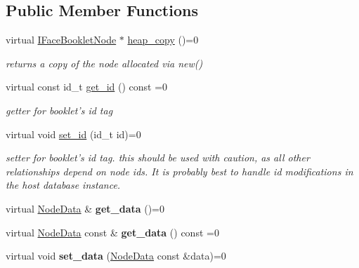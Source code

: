 \subsection*{Public Member Functions}
\begin{DoxyCompactItemize}
\item 
\hypertarget{structfb_1_1_i_face_booklet_node_a9bc90104d8cb2953baee204811aab1cf}{virtual \hyperlink{structfb_1_1_i_face_booklet_node}{I\+Face\+Booklet\+Node} $\ast$ \hyperlink{structfb_1_1_i_face_booklet_node_a9bc90104d8cb2953baee204811aab1cf}{heap\+\_\+copy} ()=0}\label{structfb_1_1_i_face_booklet_node_a9bc90104d8cb2953baee204811aab1cf}

\begin{DoxyCompactList}\small\item\em returns a copy of the node allocated via new() \end{DoxyCompactList}\item 
virtual const id\+\_\+t \hyperlink{structfb_1_1_i_face_booklet_node_a651a6fb7445f8d2c046066c1d381f424}{get\+\_\+id} () const =0
\begin{DoxyCompactList}\small\item\em getter for booklet's id tag \end{DoxyCompactList}\item 
virtual void \hyperlink{structfb_1_1_i_face_booklet_node_a944a07a514d6c88414c533dc7be3193d}{set\+\_\+id} (id\+\_\+t id)=0
\begin{DoxyCompactList}\small\item\em setter for booklet's id tag.  this should be used with caution, as all other relationships depend on node ids. It is probably best to handle id modifications in the host database instance. \end{DoxyCompactList}\item 
\hypertarget{structfb_1_1_i_face_booklet_node_acfe552a2e1c8b67bb2ffeb22e319251d}{virtual \hyperlink{classfb_1_1_node_data}{Node\+Data} \& {\bfseries get\+\_\+data} ()=0}\label{structfb_1_1_i_face_booklet_node_acfe552a2e1c8b67bb2ffeb22e319251d}

\item 
\hypertarget{structfb_1_1_i_face_booklet_node_a5f41418b1a6d7100b6ab340a63046713}{virtual \hyperlink{classfb_1_1_node_data}{Node\+Data} const \& {\bfseries get\+\_\+data} () const =0}\label{structfb_1_1_i_face_booklet_node_a5f41418b1a6d7100b6ab340a63046713}

\item 
\hypertarget{structfb_1_1_i_face_booklet_node_a715b1a3ece12f6cf4fcb115c0cd6db5e}{virtual void {\bfseries set\+\_\+data} (\hyperlink{classfb_1_1_node_data}{Node\+Data} const \&data)=0}\label{structfb_1_1_i_face_booklet_node_a715b1a3ece12f6cf4fcb115c0cd6db5e}


\end{DoxyCompactItemize}
